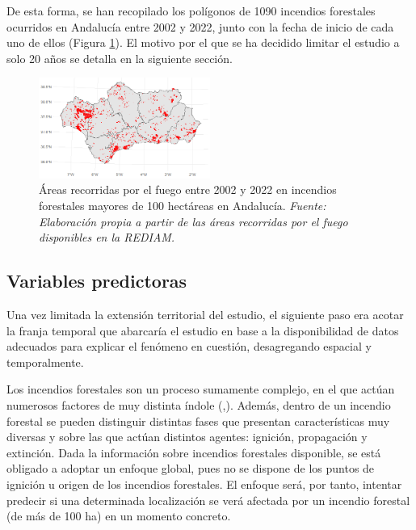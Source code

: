 \documentclass[12pt,a4paper,]{book}
\numberwithin{dummy}{section}
\theoremstyle{ocrenumbox}
\theoremstyle{blacknumex}
\theoremstyle{blacknumbox}
\theoremstyle{ocrenum}
\theoremstyle{ocrenum}
\begin{document}
De esta forma, se han recopilado los polígonos de 1090 incendios
forestales ocurridos en Andalucía entre 2002 y 2022, junto con la fecha
de inicio de cada uno de ellos (Figura \ref{fig:area_fuego}). El motivo
por el que se ha decidido limitar el estudio a solo 20 años se detalla
en la siguiente sección.

\begin{figure}[thb]
\centering
\includegraphics[width=0.5\textwidth]{graficos/areas_fuego.png}
\caption[Áreas recorridas por el fuego entre 2002 y 2022 en incendios mayores de 100 hectáreas en Andalucía]{Áreas recorridas por el fuego entre 2002 y 2022 en incendios forestales mayores de 100 hectáreas en Andalucía. \it Fuente: Elaboración propia a partir de las áreas recorridas por el fuego disponibles en la REDIAM.}
\label{fig:area_fuego}
\end{figure}

\hypertarget{variables-predictoras}{%
\subsection{Variables predictoras}\label{variables-predictoras}}

Una vez limitada la extensión territorial del estudio, el siguiente paso
era acotar la franja temporal que abarcaría el estudio en base a la
disponibilidad de datos adecuados para explicar el fenómeno en cuestión,
desagregando espacial y temporalmente.

Los incendios forestales son un proceso sumamente complejo, en el que
actúan numerosos factores de muy distinta índole
(\citet{causalidadIncendios},\citet{incendioCamCLim}). Además, dentro de
un incendio forestal se pueden distinguir distintas fases que presentan
características muy diversas y sobre las que actúan distintos agentes:
ignición, propagación y extinción. Dada la información sobre incendios
forestales disponible, se está obligado a adoptar un enfoque global,
pues no se dispone de los puntos de ignición u origen de los incendios
forestales. El enfoque será, por tanto, intentar predecir si una
determinada localización se verá afectada por un incendio forestal (de
más de 100 ha) en un momento concreto.
\end{document}
